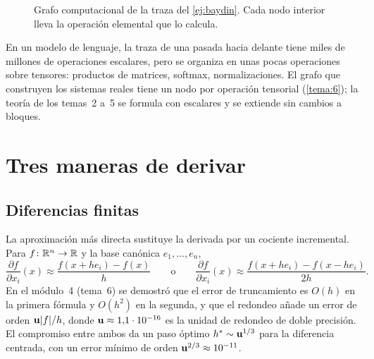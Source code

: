 \begin{figure}[h]
\centering
{}
\caption{Grafo computacional de la traza del \cref{ej:baydin}. Cada nodo interior lleva la operación elemental que lo calcula.}
\label{fig:grafo-baydin}
\end{figure}

\begin{observacion}
En un modelo de lenguaje, la traza de una pasada hacia delante tiene miles de millones de operaciones escalares, pero se organiza en unas pocas operaciones sobre tensores: productos de matrices, softmax, normalizaciones. El grafo que construyen los sistemas reales tiene un nodo por operación tensorial (\cref{tema:6}); la teoría de los temas~2 a~5 se formula con escalares y se extiende sin cambios a bloques.
\end{observacion}

\section{Tres maneras de derivar}

\subsection{Diferencias finitas}

La aproximación más directa sustituye la derivada por un cociente incremental. Para $f\colon\mathbb{R}^{n}\to\mathbb{R}$ y la base canónica $e_1,\dots,e_n$,
\[
\frac{\partial f}{\partial x_i}(x)\approx\frac{f(x+he_i)-f(x)}{h}
\qquad\text{o}\qquad
\frac{\partial f}{\partial x_i}(x)\approx\frac{f(x+he_i)-f(x-he_i)}{2h}.
\]
En el módulo~4 (tema~6) se demostró que el error de truncamiento es $O(h)$ en la primera fórmula y $O(h^{2})$ en la segunda, y que el redondeo añade un error de orden $\mathbf{u}\lvert f\rvert/h$, donde $\mathbf{u}\approx 1{,}1\cdot 10^{-16}$ es la unidad de redondeo de doble precisión. El compromiso entre ambos da un paso óptimo $h^{*}\sim\mathbf{u}^{1/3}$ para la diferencia centrada, con un error mínimo de orden $\mathbf{u}^{2/3}\approx 10^{-11}$.

